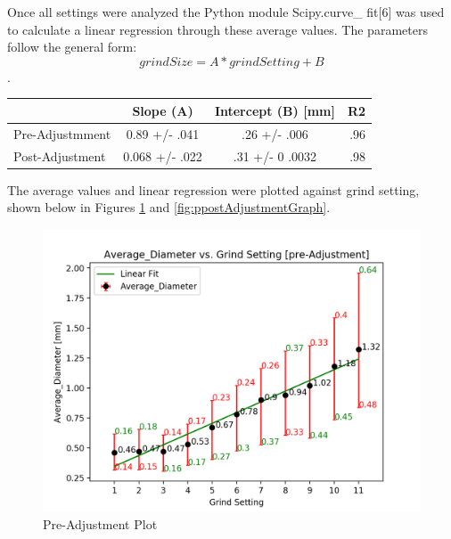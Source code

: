 \documentclass[10pt,a4paper,twocolumn,notitlepage]{article}
\begin{document}
Once all settings were analyzed the Python module Scipy.curve\_ fit[6] was used to calculate a linear regression through these average values. The parameters follow the general form: $$grindSize = A*grindSetting + B$$.

\begin{center}
\begin{table}[h!]
\begin{tabular}{ l | c | c | r |  }
\hline			
  & Slope (A) & Intercept (B) [mm] & R2 \\ \hline
Pre-Adjustmment & 0.89 +/- .041 & .26 +/- .006 & .96 \\  \hline
Post-Adjustment & 0.068 +/- .022 & .31 +/- 0 .0032 & .98 \\
\hline
\end{tabular}
\label{fig:linearParameterTable}
\end{table}
\end{center}

The average values and linear regression were plotted against grind setting, shown below in Figures \ref{fig:preAdjustmentGraph} and \ref{fig:ppostAdjustmentGraph}.
\begin{center}\begin{figure}[h!]
\includegraphics[width=\columnwidth]{preAdjustmentAverage_DiameterPlot.png}\caption{Pre-Adjustment Plot}\label{fig:preAdjustmentGraph}\end{figure}\end{center}
\end{document}
